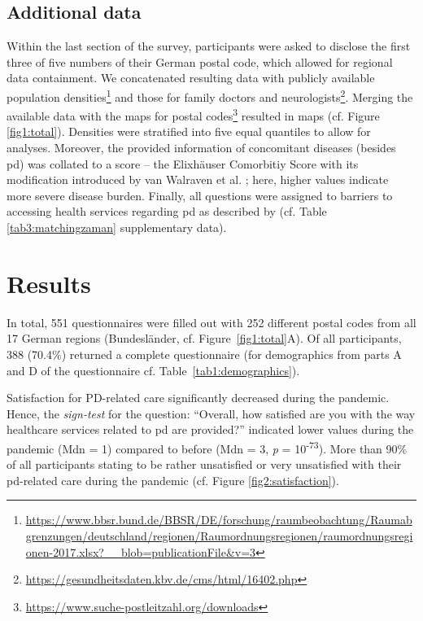 \documentclass{bmcart}
\begin{document}
\subsection*{Additional data}
Within the last section of the survey, participants were asked to disclose the first three of five numbers of their German postal code, which allowed for regional data containment. We concatenated resulting data with publicly available population densities\footnote{\url{https://www.bbsr.bund.de/BBSR/DE/forschung/raumbeobachtung/Raumabgrenzungen/deutschland/regionen/Raumordnungsregionen/raumordnungsregionen-2017.xlsx?\_\_blob=publicationFile\&v=3}} and those for family doctors and neurologists\footnote{\url{https://gesundheitsdaten.kbv.de/cms/html/16402.php}}. Merging the available data with the maps for postal codes\footnote{\url{https://www.suche-postleitzahl.org/downloads}} resulted in maps (cf. Figure \ref{fig1:total}). Densities were stratified into five equal quantiles to allow for analyses. Moreover, the provided information of concomitant diseases (besides \ac{pd}) was collated to a score -- the Elixhäuser Comorbitiy Score with its modification introduced by van Walraven et al. \cite{van2009modification}; here, higher values indicate more severe disease burden. Finally, all questions were assigned to barriers to accessing health services regarding \ac{pd} as described by \cite{zaman2021barriers} (cf. Table \ref{tab3:matchingzaman} supplementary data).

\newpage

\section*{Results}
In total, 551 questionnaires were filled out with 252 different postal codes from all 17 German regions (Bundesländer, cf. Figure~\ref{fig1:total}A). Of all participants, 388 (70.4$\%$) returned a complete questionnaire (for demographics from parts A and D of the questionnaire cf. Table~\ref{tab1:demographics}). 

Satisfaction for PD-related care significantly decreased during the pandemic. Hence, the \textit{sign-test} for the question: ``Overall, how satisfied are you with the way healthcare services related to \acl{pd} are provided?'' indicated lower values during the pandemic (Mdn = 1) compared to before (Mdn = 3, \textit{p} = 10\textsuperscript{-73}). More than 90\% of all participants stating to be rather unsatisfied or very unsatisfied with their \ac{pd}-related care during the pandemic (cf. Figure \ref{fig2:satisfaction}). 
\end{document}
